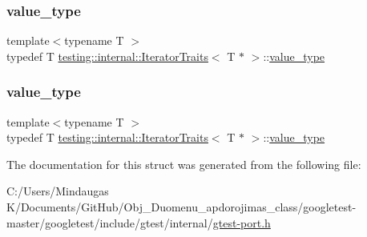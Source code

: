 \mbox{\label{structtesting_1_1internal_1_1_iterator_traits_3_01_t_01_5_01_4_a7e46869ed36cc5aea898e243d270a8be}} 
\subsubsection{\texorpdfstring{value\_type}{value\_type}\hspace{0.1cm}{\footnotesize\ttfamily [2/3]}}
{\footnotesize\ttfamily template$<$typename T $>$ \\
typedef T \mbox{\hyperlink{structtesting_1_1internal_1_1_iterator_traits}{testing\+::internal\+::\+Iterator\+Traits}}$<$ T $\ast$ $>$\+::\mbox{\hyperlink{structtesting_1_1internal_1_1_iterator_traits_3_01_t_01_5_01_4_a7e46869ed36cc5aea898e243d270a8be}{value\+\_\+type}}}

\mbox{\label{structtesting_1_1internal_1_1_iterator_traits_3_01_t_01_5_01_4_a7e46869ed36cc5aea898e243d270a8be}} 
\subsubsection{\texorpdfstring{value\_type}{value\_type}\hspace{0.1cm}{\footnotesize\ttfamily [3/3]}}
{\footnotesize\ttfamily template$<$typename T $>$ \\
typedef T \mbox{\hyperlink{structtesting_1_1internal_1_1_iterator_traits}{testing\+::internal\+::\+Iterator\+Traits}}$<$ T $\ast$ $>$\+::\mbox{\hyperlink{structtesting_1_1internal_1_1_iterator_traits_3_01_t_01_5_01_4_a7e46869ed36cc5aea898e243d270a8be}{value\+\_\+type}}}



The documentation for this struct was generated from the following file\+:\begin{DoxyCompactItemize}
\item 
C\+:/\+Users/\+Mindaugas K/\+Documents/\+Git\+Hub/\+Obj\+\_\+\+Duomenu\+\_\+apdorojimas\+\_\+class/googletest-\/master/googletest/include/gtest/internal/\mbox{\hyperlink{googletest-master_2googletest_2include_2gtest_2internal_2gtest-port_8h}{gtest-\/port.\+h}}\end{DoxyCompactItemize}

